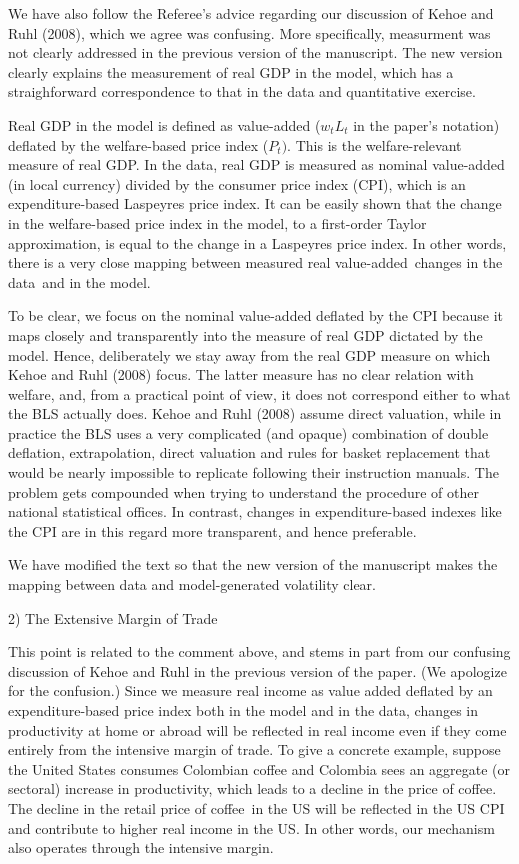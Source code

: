\documentclass[12pt]{article}
\begin{document}
We have also follow the Referee's advice regarding our discussion of Kehoe
and Ruhl (2008), which we agree was confusing. More specifically, measurment
was not clearly addressed in the previous version of the manuscript. The new
version clearly explains the measurement of real GDP in the model, which has
a straighforward correspondence to that in the data and quantitative
exercise.

Real GDP in the model is defined as value-added ($w_{t}L_{t}$ in the paper's
notation) deflated by the welfare-based price index ($P_{t})$. This is the
welfare-relevant measure of real GDP. In the data, real GDP is measured as
nominal value-added (in local currency) divided by the consumer price index
(CPI), which is an expenditure-based Laspeyres price index. It can be easily
shown that the change in the welfare-based price index in the model, to a
first-order Taylor approximation, is equal to the change in a Laspeyres
price index. In other words, there is a very close mapping between measured
real value-added\ changes in the data\ and in the model.

To be clear, we focus on the nominal value-added deflated by the CPI because
it maps closely and transparently into the measure of real GDP dictated by
the model. Hence, deliberately we stay away from the real GDP measure on
which Kehoe and Ruhl (2008) focus. The latter measure has no clear relation
with welfare, and, from a practical point of view, it does not correspond
either to what the BLS actually does. Kehoe and Ruhl (2008) assume direct
valuation, while in practice the BLS uses a very complicated (and opaque)
combination of double deflation, extrapolation, direct valuation and rules
for basket replacement that would be nearly impossible to replicate
following their instruction manuals. The problem gets compounded when trying
to understand the procedure of other national statistical offices. In
contrast, changes in expenditure-based indexes like the CPI are in this
regard more transparent, and hence preferable.

We have modified the text so that the new version of the manuscript makes
the mapping between data and model-generated volatility clear.

\bigskip

2) The Extensive Margin of Trade

This point is related to the comment above, and stems in part from our
confusing discussion of Kehoe and Ruhl in the previous version of the paper.
(We apologize for the confusion.) Since we measure real income as value
added deflated by an expenditure-based price index both in the model and in
the data, changes in productivity at home or abroad will be reflected in
real income even if they come entirely from the intensive margin of trade.
To give a concrete example, suppose the United States consumes Colombian
coffee and Colombia sees an aggregate (or sectoral) increase in
productivity, which leads to a decline in the price of coffee. The decline
in the retail price of coffee\ in the US will be reflected in the US CPI and
contribute to higher real income in the US. In other words, our mechanism
also operates through the intensive margin.
\end{document}
